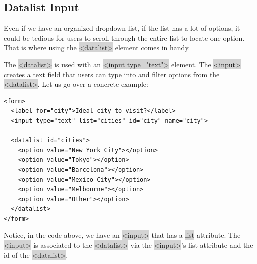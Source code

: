 \documentclass[11pt]{article}
\begin{document}
\subsection{Datalist Input}
Even if we have an organized dropdown list, if the list has a lot of options, it could be tedious for users to scroll through the entire list to locate one option. That is where using the \colorbox{lightgray}{<datalist>} element comes in handy.

The \colorbox{lightgray}{<datalist>} is used with an \colorbox{lightgray}{<input type="text">} element. The \colorbox{lightgray}{<input>} creates a text field that users can type into and filter options from the \colorbox{lightgray}{<datalist>}. Let us go over a concrete example:
\begin{lstlisting}
<form>
  <label for="city">Ideal city to visit?</label>
  <input type="text" list="cities" id="city" name="city">

  <datalist id="cities">
    <option value="New York City"></option>
    <option value="Tokyo"></option>
    <option value="Barcelona"></option>
    <option value="Mexico City"></option>
    <option value="Melbourne"></option>
    <option value="Other"></option>  
  </datalist>
</form>
\end{lstlisting}
Notice, in the code above, we have an \colorbox{lightgray}{<input>} that has a \colorbox{lightgray}{list} attribute. The \colorbox{lightgray}{<input>} is associated to the \colorbox{lightgray}{<datalist>} via the \colorbox{lightgray}{<input>}'s list attribute and the id of the \colorbox{lightgray}{<datalist>}.
\end{document}
